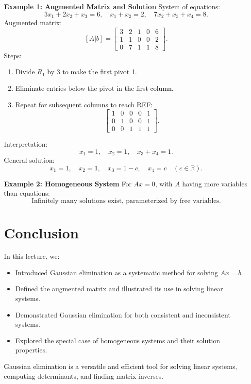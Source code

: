\documentclass{article}
\begin{document}
\textbf{Example 1: Augmented Matrix and Solution}
System of equations:
\[
  3x_1 + 2x_2 + x_3 = 6, \quad x_1 + x_2 = 2, \quad 7x_2 + x_3 + x_4 = 8.
\]
Augmented matrix:
\[
  [A|b] =
  \begin{bmatrix}
    3 & 2 & 1 & 0 & 6 \\
    1 & 1 & 0 & 0 & 2 \\
    0 & 7 & 1 & 1 & 8
  \end{bmatrix}.
\]
Steps:
\begin{enumerate}
  \item Divide $R_1$ by 3 to make the first pivot 1.
  \item Eliminate entries below the pivot in the first column.
  \item Repeat for subsequent columns to reach REF:
    \[
      \begin{bmatrix}
        1 & 0 & 0 & 0 & 1 \\
        0 & 1 & 0 & 0 & 1 \\
        0 & 0 & 1 & 1 & 1
      \end{bmatrix}.
    \]
\end{enumerate}
Interpretation:
\[
  x_1 = 1, \quad x_2 = 1, \quad x_3 + x_4 = 1.
\]
General solution:
\[
  x_1 = 1, \quad x_2 = 1, \quad x_3 = 1 - c, \quad x_4 = c \quad (c \in \mathbb{R}).
\]

\textbf{Example 2: Homogeneous System}
For $Ax = 0$, with $A$ having more variables than equations:
\[
  \text{Infinitely many solutions exist, parameterized by free variables.}
\]

\section*{Conclusion}

In this lecture, we:
\begin{itemize}
  \item Introduced Gaussian elimination as a systematic method for solving $Ax = b$.
  \item Defined the augmented matrix and illustrated its use in solving linear systems.
  \item Demonstrated Gaussian elimination for both consistent and inconsistent systems.
  \item Explored the special case of homogeneous systems and their solution properties.
\end{itemize}

Gaussian elimination is a versatile and efficient tool for solving linear systems, computing determinants, and finding matrix inverses.
\end{document}
